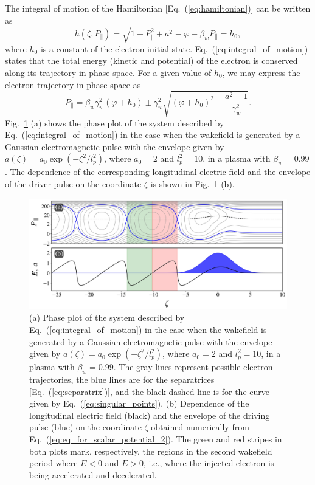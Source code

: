 \documentclass[10pt, a4paper, twoside, openright]{report}
\begin{document}
The integral of motion of the Hamiltonian [Eq.~(\ref{eq:hamiltonian})] can be written as \cite{Esirkepov2006, Esarey2009, Bulanov2013}
\begin{equation}\label{eq:integral_of_motion}
	h\left( \zeta, P_{\parallel} \right) = \sqrt{1 + P_{\parallel}^2 + a^2} - \varphi - \beta_w P_{\parallel} = h_0,
\end{equation}
where $ h_0 $ is a constant of the electron initial state. Eq.~(\ref{eq:integral_of_motion}) states that the total energy (kinetic and potential) of the electron is conserved along its trajectory in phase space. For a given value of $ h_0 $, we may express the electron trajectory in phase space as \cite{Schroeder2006, Esarey2009}
\begin{equation}\label{eq:electron_trajectories}
P_{\parallel} = \beta_w \gamma_w^2 \left( \varphi + h_0 \right) \pm \gamma_w^2 \sqrt{\left( \varphi + h_0 \right)^2 - \frac{a^2 + 1}{\gamma_w^2}}.
\end{equation}
Fig.~\ref{fig:phase_plot} (a) shows the phase plot of the system described by Eq.~(\ref{eq:integral_of_motion}) in the case when the wakefield is generated by a Gaussian electromagnetic pulse with the envelope given by $ a \left( \zeta \right) = a_0 \exp \left( -\zeta^2 / l_p^2 \right) $, where $ a_0 = 2 $ and $ l_p^2 = 10 $, in a plasma with $ \beta_w = 0.99 $. The dependence of the corresponding longitudinal electric field and the envelope of the driver pulse on the coordinate $ \zeta $ is shown in Fig.~\ref{fig:phase_plot} (b). 

\begin{figure}[t]
	\includegraphics[width=0.9\linewidth]{img/phase_plot.jpg}
	\caption[]{\label{fig:phase_plot} (a) Phase plot of the system described by Eq.~(\ref{eq:integral_of_motion}) in the case when the wakefield is generated by a Gaussian electromagnetic pulse with the envelope given by $ a \left( \zeta \right) = a_0 \exp \left( -\zeta^2 / l_p^2 \right) $, where $ a_0 = 2 $ and $ l_p^2 = 10 $, in a plasma with $ \beta_w = 0.99 $. The gray lines represent possible electron trajectories, the blue lines are for the separatrices [Eq.~(\ref{eq:separatrix})], and the black dashed line is for the curve given by Eq.~(\ref{eq:singular_points}). (b) Dependence of the longitudinal electric field (black) and the envelope of the driving pulse (blue) on the coordinate $ \zeta $ obtained numerically from Eq.~(\ref{eq:eq_for_scalar_potential_2}). The green and red stripes in both plots mark, respectively, the regions in the second wakefield period where $ E < 0 $ and $ E > 0 $, i.e., where the injected electron is being accelerated and decelerated.}
\end{figure}
\end{document}
